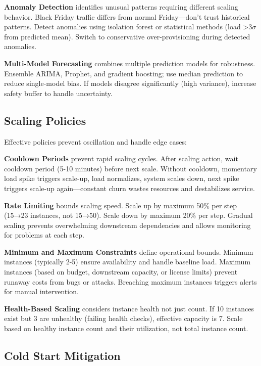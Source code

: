 \textbf{Anomaly Detection} identifies unusual patterns requiring different scaling behavior. Black Friday traffic differs from normal Friday---don't trust historical patterns. Detect anomalies using isolation forest or statistical methods (load >3$\sigma$ from predicted mean). Switch to conservative over-provisioning during detected anomalies.

\textbf{Multi-Model Forecasting} combines multiple prediction models for robustness. Ensemble ARIMA, Prophet, and gradient boosting; use median prediction to reduce single-model bias. If models disagree significantly (high variance), increase safety buffer to handle uncertainty.

\subsection{Scaling Policies}

Effective policies prevent oscillation and handle edge cases:

\textbf{Cooldown Periods} prevent rapid scaling cycles. After scaling action, wait cooldown period (5-10 minutes) before next scale. Without cooldown, momentary load spike triggers scale-up, load normalizes, system scales down, next spike triggers scale-up again---constant churn wastes resources and destabilizes service.

\textbf{Rate Limiting} bounds scaling speed. Scale up by maximum 50\% per step (15→23 instances, not 15→50). Scale down by maximum 20\% per step. Gradual scaling prevents overwhelming downstream dependencies and allows monitoring for problems at each step.

\textbf{Minimum and Maximum Constraints} define operational bounds. Minimum instances (typically 2-5) ensure availability and handle baseline load. Maximum instances (based on budget, downstream capacity, or license limits) prevent runaway costs from bugs or attacks. Breaching maximum instances triggers alerts for manual intervention.

\textbf{Health-Based Scaling} considers instance health not just count. If 10 instances exist but 3 are unhealthy (failing health checks), effective capacity is 7. Scale based on healthy instance count and their utilization, not total instance count.

\subsection{Cold Start Mitigation}

